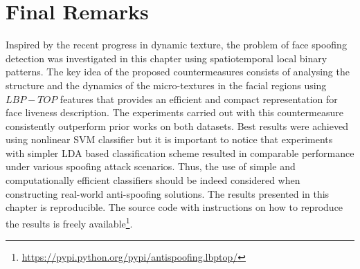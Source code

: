 
\section{Final Remarks}
\label{sec:Proposed_finalremarks}

Inspired by the recent progress in dynamic texture, the problem of face spoofing detection was investigated in this chapter using spatiotemporal local binary patterns. The key idea of the proposed countermeasures consists of analysing the structure and the dynamics of the micro-textures in the facial regions using $LBP-TOP$ features that provides an efficient and compact representation for face liveness description. The experiments carried out with this countermeasure consistently outperform prior works on both datasets. Best results were achieved using nonlinear SVM classifier but it is important to notice that experiments with simpler LDA based classification scheme resulted in comparable performance under various spoofing attack scenarios. Thus, the use of simple and computationally efficient classifiers should be indeed considered when constructing real-world anti-spoofing solutions. The results presented in this chapter is reproducible. The source code with instructions on how to reproduce the results is freely available\footnote{\url{https://pypi.python.org/pypi/antispoofing.lbptop/}}.

